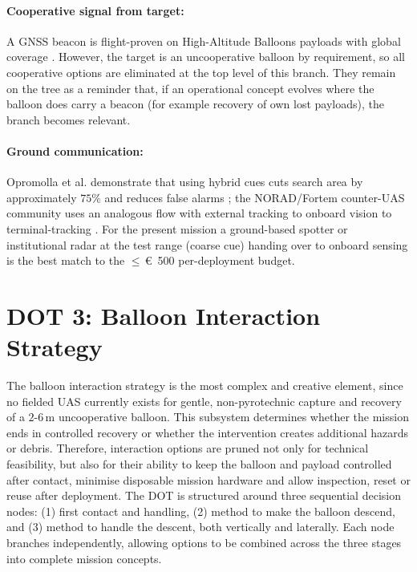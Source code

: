 \vspace{-10pt}

\paragraph{Cooperative signal from target:} A GNSS beacon is flight-proven on High-Altitude Balloons payloads with global coverage \cite{Clark2019AnPayloads}. However, the target is an uncooperative balloon by requirement, so all cooperative options are eliminated at the top level of this branch. They remain on the tree as a reminder that, if an operational concept evolves where the balloon does carry a beacon (for example recovery of own lost payloads), the branch becomes relevant. 


\vspace{-10pt}

\paragraph{Ground communication:} Opromolla et al. demonstrate that using hybrid cues cuts search area by approximately $75\%$ and reduces false alarms \cite{Opromolla2019AirborneLearning}; the NORAD/Fortem counter-UAS community uses an analogous flow with external tracking to onboard vision to terminal-tracking \cite{Fortem}. For the present mission a ground-based spotter or institutional radar at the test range (coarse cue) handing over to onboard sensing is the best match to the $\leq$\,\euro\, 500 per-deployment budget.

\vspace{-15pt}
\section{DOT 3: Balloon Interaction Strategy}
\label{sec:dot_interaction}

The balloon interaction strategy is the most complex and creative element, since no fielded UAS currently exists for gentle, non-pyrotechnic capture and recovery of a $2$-$6\,\mathrm{m}$ uncooperative balloon. This subsystem determines whether the mission ends in controlled recovery or whether the intervention creates additional hazards or debris. Therefore, interaction options are pruned not only for technical feasibility, but also for their ability to keep the balloon and payload controlled after contact, minimise disposable mission hardware and allow inspection, reset or reuse after deployment. The DOT is structured around three sequential decision nodes: (1) first contact and handling, (2) method to make the balloon descend, and (3) method to handle the descent, both vertically and laterally. Each node branches independently, allowing options to be combined across the three stages into complete mission concepts.
\vspace{-10pt}
